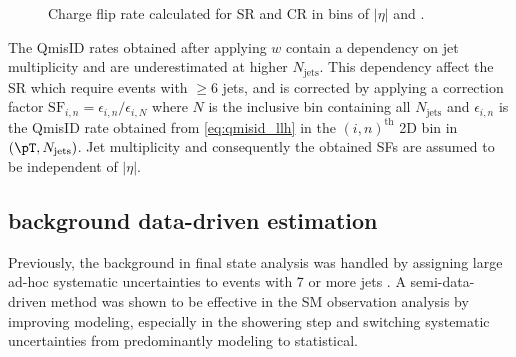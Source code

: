 \documentclass[../thesis.tex]{subfiles}
\begin{document}
\begin{figure}[!htb]
\centering
{}
\caption{\label{fig:ana:qmisid}Charge flip rate calculated for \acs{SR} and \acs{CR} \ttW in bins of $|\eta|$ and \pT.}
\end{figure}

The \acs{QmisID} rates obtained after applying $w$ contain a dependency on jet multiplicity and are underestimated at higher $N_\text{jets}$. This dependency affect the \acs{SR} which require events with $\geq 6$ jets, and is corrected by applying a correction factor $\text{SF}_{i,n} = \epsilon_{i,n}/\epsilon_{i,N}$ where $N$ is the inclusive bin containing all $N_\text{jets}$ and $\epsilon_{i,n}$ is the \acs{QmisID} rate obtained from \autoref{eq:qmisid_llh} in the $(i,n)^\text{th}$ 2D bin in $(\pT, N_\text{jets})$. Jet multiplicity and consequently the obtained \acs{SF}s are assumed to be independent of $|\eta|$.




\subsection{\ttW background data-driven estimation}
\label{sec:ttW_BG}
Previously, the \ttW background in \tttt final state analysis was handled by assigning large ad-hoc systematic uncertainties to \ttW events with 7 or more jets \citep{tttt_evidence}. A semi-data-driven method \citep{ana:r_par_susy_2021} was shown to be effective in the SM \tttt observation analysis \citep{tttt_obs} by improving \ttW modeling, especially in the showering step and switching \ttW systematic uncertainties from predominantly modeling to statistical.
\end{document}
